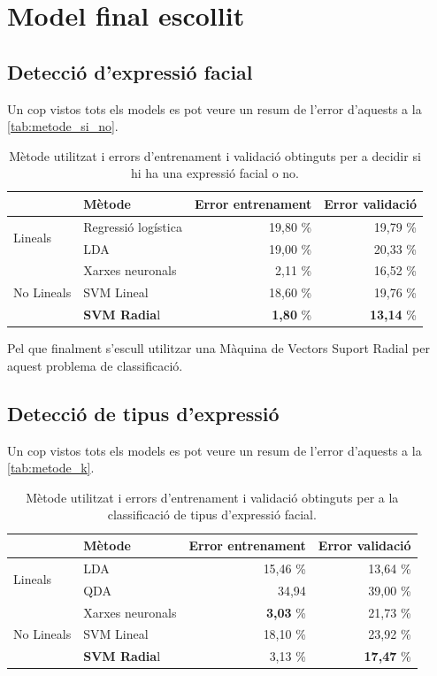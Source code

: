 \documentclass[a4paper]{article}
\begin{document}
\newpage
\section{Model final escollit}
\subsection{Detecció d'expressió facial}
Un cop vistos tots els models es pot veure un resum de l'error d'aquests a la \autoref{tab:metode_si_no}.

\begin{table}[H]
	\centering
	\def\arraystretch{1.4}
	\begin{tabular}{|l|l|rr|}
		\cline{2-4}
		\multicolumn{1}{c|}{}
		& Mètode & Error entrenament & Error validació \\
		\hline
		\multirow{2}{*}{Lineals}
		& Regressió logística & 19,80 \% & 19,79 \% \\
		& LDA & 19,00 \% & 20,33 \% \\
		\hline
		\multirow{3}{*}{No Lineals}
		& Xarxes neuronals & 2,11 \% & 16,52 \% \\
		& SVM Lineal & 18,60 \% & 19,76 \% \\
		& \textbf{SVM Radia}l & \textbf{1,80} \% & \textbf{13,14} \% \\
		\hline
	\end{tabular}
	\captionsetup{width=0.8\textwidth}
	\caption{Mètode utilitzat i errors d'entrenament i validació obtinguts per a decidir si hi ha una expressió facial o no.}
	\label{tab:metode_si_no}
\end{table}

Pel que finalment s'escull utilitzar una Màquina de Vectors Suport Radial per aquest problema de classificació.

\subsection{Detecció de tipus d'expressió}

Un cop vistos tots els models es pot veure un resum de l'error d'aquests a la \autoref{tab:metode_k}.

\begin{table}[H]
	\centering
	\def\arraystretch{1.4}
	\begin{tabular}{|l|l|rr|}
		\cline{2-4}
		\multicolumn{1}{c|}{}
		& Mètode & Error entrenament & Error validació \\
		\hline
		\multirow{2}{*}{Lineals}
		& LDA & 15,46 \% & 13,64 \% \\
		& QDA & 34,94 & 39,00 \% \\
		\hline
		\multirow{3}{*}{No Lineals}
		& Xarxes neuronals & \textbf{3,03} \% & 21,73 \% \\
		& SVM Lineal & 18,10 \% & 23,92 \% \\
		& \textbf{SVM Radia}l & 3,13 \% & \textbf{17,47} \% \\
		\hline
	\end{tabular}
	\captionsetup{width=0.8\textwidth}
	\caption{Mètode utilitzat i errors d'entrenament i validació obtinguts per a la classificació de tipus d'expressió facial.}
	\label{tab:metode_k}
\end{table}
\end{document}
